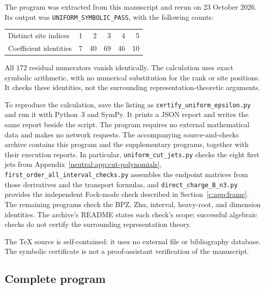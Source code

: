 \documentclass[11pt,a4paper]{article}
\numberwithin{equation}{section}
\theoremstyle{definition}\newtheorem{definition}[theorem]{Definition}
\theoremstyle{remark}\newtheorem{remark}[theorem]{Remark}
\begin{document}
The program was extracted from this manuscript and rerun on
23 October 2026. Its output was
\texttt{UNIFORM\_SYMBOLIC\_PASS}, with the following counts:
\begin{center}
\begin{tabular}{@{}lrrrrr@{}}
\toprule
Distinct site indices & 1 & 2 & 3 & 4 & 5\\
Coefficient identities & 7 & 40 & 69 & 46 & 10\\
\bottomrule
\end{tabular}
\end{center}
All 172 residual numerators vanish identically. The calculation uses
exact symbolic arithmetic, with no numerical substitution for the rank
or site positions. It checks these identities, not the surrounding
representation-theoretic arguments.

To reproduce the calculation, save the listing as
\nolinkurl{certify_uniform_epsilon.py} and run it with Python~3 and
SymPy. It prints a JSON report and writes the same report beside the
script. The program requires no external mathematical data and makes
no network requests. The accompanying source-and-checks archive
contains this program and the supplementary programs, together
with their execution reports. In particular,
\nolinkurl{uniform_cut_jets.py} checks the eight first jets
from Appendix~\ref{neutral:app:cut-polynomials},
\nolinkurl{first_order_all_interval_checks.py} assembles the endpoint
matrices from those derivatives and the transport formulas, and
\nolinkurl{direct_charge_B_n3.py} provides the independent Fock-mode
check described in Section~\ref{c:app:frame}. The remaining programs
check the BPZ, Zhu, interval, heavy-root, and dimension identities.
The archive's README states each check's scope; successful algebraic
checks do not certify the surrounding representation theory.

The TeX source is self-contained: it uses no external
\verb|| file or bibliography database. The symbolic certificate
is not a proof-assistant verification of the manuscript.

\subsection{Complete program}
\end{document}
